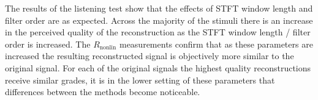 %
%
		The results of the listening test show that the effects of STFT window length and filter order are as
		expected. Across the majority of the stimuli there is an increase in the perceived quality of the
		reconstruction as the STFT window length / filter order is increased. The $R_{\mathrm{nonlin}}$
		measurements confirm that as these parameters are increased the resulting reconstructed signal is
		objectively more similar to the original signal. For each of the original signals the highest quality
		reconstructions receive similar grades, it is in the lower setting of these parameters that differences
		between the methods become noticeable.


